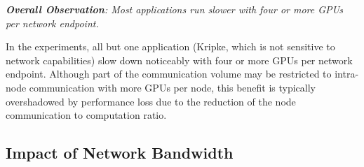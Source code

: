

\vspace{1em}
\noindent
{\it \textbf{Overall Observation}:
Most applications run slower with four or more GPUs per network endpoint.} 

\noindent In the experiments, all but one application (Kripke, which is not
sensitive to network capabilities) slow down noticeably with four or more GPUs per network
endpoint.
Although part of the communication volume may be restricted to intra-node communication
with more GPUs per node, this benefit is typically overshadowed by performance
loss due to the reduction of the node communication to computation ratio.  








\subsection{Impact of Network Bandwidth}

